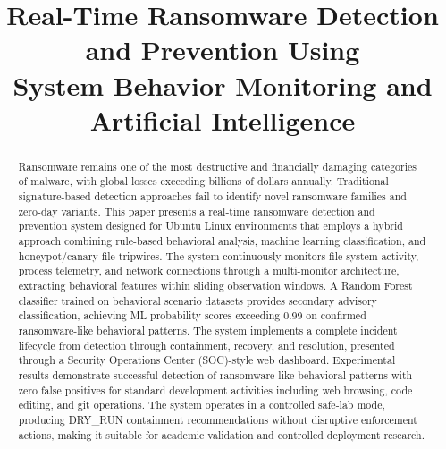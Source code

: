 \documentclass[conference]{IEEEtran}
\begin{document}
\title{Real-Time Ransomware Detection and Prevention Using\\
System Behavior Monitoring and Artificial Intelligence}

\author{
}

\maketitle


\begin{abstract}
Ransomware remains one of the most destructive and financially
damaging categories of malware, with global losses exceeding
billions of dollars annually. Traditional signature-based
detection approaches fail to identify novel ransomware families
and zero-day variants. This paper presents a real-time
ransomware detection and prevention system designed for
Ubuntu Linux environments that employs a hybrid approach
combining rule-based behavioral analysis, machine learning
classification, and honeypot/canary-file tripwires. The system
continuously monitors file system activity, process telemetry,
and network connections through a multi-monitor architecture,
extracting behavioral features within sliding observation
windows. A Random Forest classifier trained on behavioral
scenario datasets provides secondary advisory classification,
achieving ML probability scores exceeding 0.99 on confirmed
ransomware-like behavioral patterns. The system implements
a complete incident lifecycle from detection through
containment, recovery, and resolution, presented through
a Security Operations Center (SOC)-style web dashboard.
Experimental results demonstrate successful detection of
ransomware-like behavioral patterns with zero false positives
for standard development activities including web browsing,
code editing, and git operations. The system operates in a
controlled safe-lab mode, producing DRY\_RUN containment
recommendations without disruptive enforcement actions,
making it suitable for academic validation and controlled
deployment research.
\end{abstract}
\end{document}
